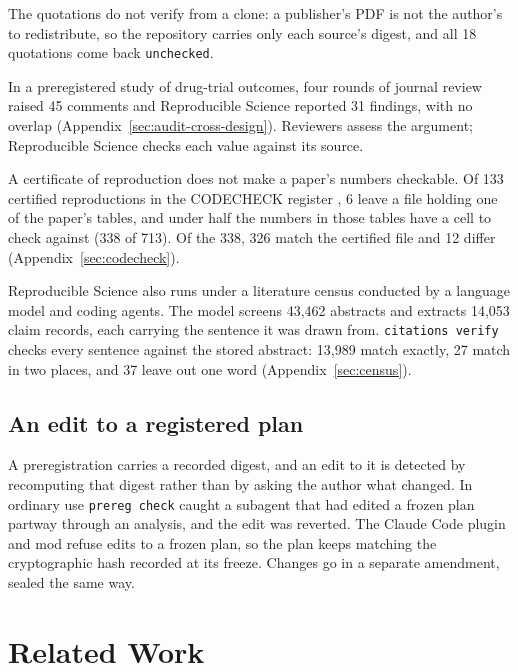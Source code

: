 \documentclass{article}
\newcommand{\code}[1]{\texttt{#1}}
\begin{document}
The quotations do not verify from a clone: a publisher's PDF is not the author's to redistribute, so the repository
carries only each source's digest, and all 18 quotations come back
\code{unchecked}.

In a preregistered study of drug-trial outcomes, four rounds of journal review raised 45 comments
and Reproducible Science reported 31 findings, with no overlap (Appendix~\ref{sec:audit-cross-design}). Reviewers
assess the argument; Reproducible Science checks each value against its source.

A certificate of reproduction does not make a paper's numbers checkable. Of 133 certified
reproductions in the CODECHECK register \citep{nust2021codecheck}, 6 leave a file holding one of
the paper's tables, and under half the numbers in those tables have a cell to check against
(338 of 713). Of the 338, 326 match the certified file and 12 differ
(Appendix~\ref{sec:codecheck}).

Reproducible Science also runs under a literature census conducted by a language model and coding agents.
The model screens 43{,}462 abstracts and extracts 14{,}053 claim records, each carrying the
sentence it was drawn from. \code{citations verify} checks every sentence against the stored abstract:
13{,}989 match exactly, 27 match in two places, and 37 leave out one word
(Appendix~\ref{sec:census}).

\subsection{An edit to a registered plan}

A preregistration carries a recorded digest, and an edit to it is detected by recomputing that
digest rather than by asking the author what changed. In ordinary use \code{prereg check} caught
a subagent that had edited a frozen plan partway through an analysis, and the edit was reverted.
The Claude Code plugin and mod refuse edits to a frozen plan, so the plan keeps matching the
cryptographic hash recorded at its freeze. Changes go in a separate amendment, sealed the same way.

\section{Related Work}
\label{sec:related}
\end{document}
